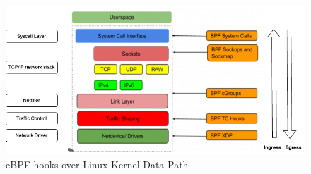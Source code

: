 \documentclass [11pt, proquest] {uwthesis}[2020/02/24]
\begin{document}




\begin{figure}
\includegraphics[width=1.0\textwidth]{images/kernel_datapath.png}
\caption{eBPF hooks over Linux Kernel Data Path}
\label{sec:ebpf-hooks-kernel-network-datapath}
\end{figure}
\end{document}
